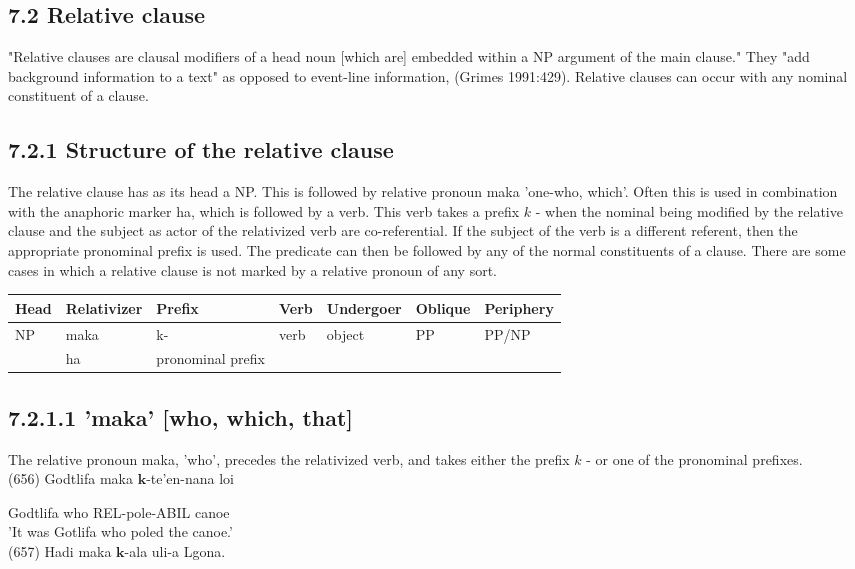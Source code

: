 \documentclass[10pt]{article}
\begin{document}
\subsection*{7.2 Relative clause}
"Relative clauses are clausal modifiers of a head noun [which are] embedded within a NP argument of the main clause." They "add background information to a text" as opposed to event-line information, (Grimes 1991:429). Relative clauses can occur with any nominal constituent of a clause.

\subsection*{7.2.1 Structure of the relative clause}
The relative clause has as its head a NP. This is followed by relative pronoun maka 'one-who, which'. Often this is used in combination with the anaphoric marker ha, which is followed by a verb. This verb takes a prefix \(k\) - when the nominal being modified by the relative clause and the subject as actor of the relativized verb are co-referential. If the subject of the verb is a different referent, then the appropriate pronominal prefix is used. The predicate can then be followed by any of the normal constituents of a clause. There are some cases in which a relative clause is not marked by a relative pronoun of any sort.

\begin{center}
\begin{tabular}{|l|l|l|l|l|l|l|}
\hline
Head & Relativizer & Prefix & Verb & Undergoer & Oblique & Periphery \\
\hline
NP & maka & k- & verb & object & PP & PP/NP \\
\hline
 & ha & pronominal prefix &  &  &  &  \\
\hline
\end{tabular}
\end{center}

\subsection*{7.2.1.1 'maka' [who, which, that]}
The relative pronoun maka, 'who', precedes the relativized verb, and takes either the prefix \(k\) - or one of the pronominal prefixes.\\
(656) Godtlifa maka \(\boldsymbol{k}\)-te'en-nana loi

Godtlifa who REL-pole-ABIL canoe\\
'It was Gotlifa who poled the canoe.'\\
(657) Hadi maka \(\boldsymbol{k}\)-ala uli-a Lgona.
\end{document}
